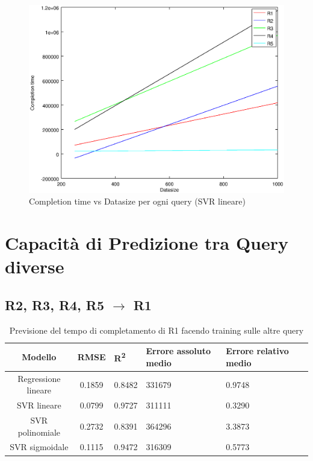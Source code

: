 \documentclass[a4paper,11pt]{article}
\begin{document}
\begin {figure}[hbtp]
\centering
\includegraphics[width=\textwidth]{output/QUERY_COMP_DATASIZE/SVRlineare/plot.eps}
\caption {Completion time vs Datasize per ogni query (SVR lineare)}
\end {figure}

\newpage
\section{Capacità di Predizione tra Query diverse}
\subsection{R2, R3, R4, R5 $\rightarrow$ R1}
\begin{table}[H]
	\centering
	\begin{adjustbox}{center}
		\begin{tabular}{c | c M{1.2cm} M{2.5cm} M{2.5cm} M{1.8cm}}
			Modello & RMSE & R\textsuperscript{2} & Errore assoluto medio & Errore relativo medio \tabularnewline
			\hline
			Regressione lineare & 0.1859 & 0.8482 & 331679 & 0.9748 \\
			SVR lineare & 0.0799 & 0.9727 & 311111 & 0.3290 \\
			SVR polinomiale & 0.2732 & 0.8391 & 364296 & 3.3873 \\
			SVR sigmoidale & 0.1115 & 0.9472 & 316309 & 0.5773 \\
		\end{tabular}
	\end{adjustbox}
	\\
	\caption{Previsione del tempo di completamento di R1 facendo training sulle altre query}
	\label{table_R1_prediction_all}
\end{table}
\end{document}
